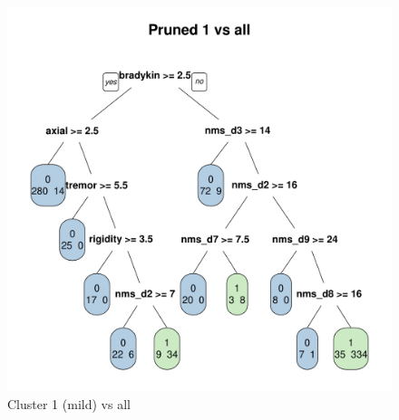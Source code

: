 \documentclass[10pt]{article}
\begin{document}
\begin{multicols}{2}
\begin{figure}[H]
  \centering
  \includegraphics[width=0.75\linewidth]{dtree-1va-pruned.pdf}
  \caption{Cluster 1 (mild) vs all}
  \label{fig:1va}
\end{figure}


\end{multicols}
\end{document}
